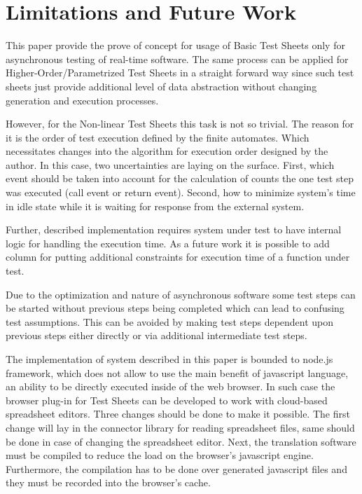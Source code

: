 

\chapter{Limitations and Future Work}
\label{chap:limits}
This paper provide the  prove of concept for usage of Basic Test Sheets only for asynchronous testing of real-time software. The same process can be applied for Higher-Order/Parametrized Test Sheets in a straight forward way since such test sheets just provide additional level of data abstraction without changing generation and execution processes.

However, for the Non-linear Test Sheets this task is not so trivial. The reason for it is the order of test execution defined by the finite automates. Which necessitates changes into the algorithm for execution order designed by the author. In this case, two uncertainties are laying on the surface. First, which event should be taken into account for the calculation of counts the one test step was executed (call event or return event). Second, how to minimize system's time in idle state while it is waiting for response from the external system.

Further, described implementation requires system under test to have internal logic for handling the execution time. As a future work it is possible to add column for putting additional constraints for execution time of a function under test.

Due to the optimization and nature of asynchronous software some test steps can be started without previous steps being completed which can lead to confusing test assumptions. This can be avoided by making test steps dependent upon previous steps either directly or via additional intermediate test steps.

The implementation  of system described in this paper is bounded to node.js framework, which does not allow to use the  main benefit of javascript language, an ability to be directly executed inside of the web browser. In such case the browser plug-in for Test Sheets can be developed to work with cloud-based spreadsheet editors. Three changes should be done to make it possible. The first change will lay in the connector library for reading spreadsheet files, same should be done in case of changing the spreadsheet editor. Next, the  translation software must be compiled to reduce the load on the browser's javascript engine. Furthermore, the compilation has to be done over generated javascript files and they must be recorded into the browser's cache.

